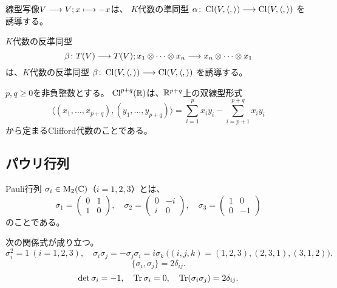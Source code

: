 \begin{dfn}
  線型写像$V\longrightarrow V; x \longmapsto -x$は、
  $K$代数の準同型
  $\alpha\colon\operatorname{Cl}(V,\langle,\rangle)\longrightarrow\operatorname{Cl}(V,\langle,\rangle)$
  を誘導する。
\end{dfn}

\begin{dfn}
  \label{dfn-beta-tranposing-antihomomorphism-clifford-algebra}
  $K$代数の反準同型
  \begin{equation}
    \beta \colon T(V)\longrightarrow T(V);
    x_1\otimes\cdots\otimes x_n \longrightarrow
    x_n\otimes\cdots\otimes x_1
  \end{equation}
  は、$K$代数の反準同型
  $\beta \colon\operatorname{Cl}(V,\langle,\rangle)\longrightarrow\operatorname{Cl}(V,\langle,\rangle)$
  を誘導する。
\end{dfn}

\begin{dfn}
  $p,q\geq 0$を非負整数とする。
  $\operatorname{Cl}^{p+q}(\mathbb{R})$は、$\mathbb{R}^{p+q}$上の双線型形式
  \begin{equation}
    \langle(x_1,\ldots,x_{p+q}),(y_1,\ldots,y_{p+q})\rangle=
    \sum_{i=1}^{p}x_iy_i-\sum_{i={p+1}}^{p+q}x_iy_i
  \end{equation}
  から定まるClifford代数のことである。
\end{dfn}

\subsection{パウリ行列}
\begin{dfn}
  Pauli行列 $\sigma_i \in \operatorname{M}_2(\mathbb{C})$（$i=1,2,3$）とは、
  \begin{equation}
    \sigma_1 = \begin{pmatrix}0&1\\1&0\end{pmatrix},\quad
    \sigma_2 = \begin{pmatrix}0&-i\\i&0\end{pmatrix},\quad
    \sigma_3 = \begin{pmatrix}1&0\\0&-1\end{pmatrix}
  \end{equation}
  のことである。
\end{dfn}

\begin{thm}
  次の関係式が成り立つ。
  \begin{equation}
    \sigma_i^2 = 1\ (i = 1,2,3),\quad
    \sigma_i\sigma_j=-\sigma_j\sigma_i=i\sigma_k
    \ \bigl((i,j,k)=(1,2,3),(2,3,1),(3,1,2)\bigr).
  \end{equation}
  \begin{equation}
    \{\sigma_i,\sigma_j\}=2\delta_{ij}.
  \end{equation}
  \begin{equation}
    \det \sigma_i = -1,\quad \operatorname{Tr} \sigma_i = 0, \quad
    \operatorname{Tr} (\sigma_i \sigma_j) = 2\delta_{ij}.
  \end{equation}
\end{thm}

